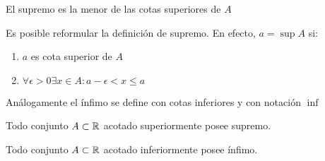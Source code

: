     \begin{obs}
        El supremo es la menor de las cotas superiores de $A$
    \end{obs}

    \begin{obs}
        Es posible reformular la definición de supremo. En efecto, $a=\sup A$ si:
        \begin{enumerate}
            \item $a$ es cota superior de $A$

            \item $\forall\epsilon>0\exists x\in A:a-\epsilon<x\leq a$

        \end{enumerate}
    \end{obs}

    \begin{defn}[Ínfimo]
        Análogamente el ínfimo se define con cotas inferiores y con notación $\inf$
    \end{defn}
    \begin{defn}
        Todo conjunto $A\subset\mathbb{R}$ acotado superiormente posee supremo.
    \end{defn}
    \begin{obs}
        Todo conjunto $A\subset\mathbb{R}$ acotado inferiormente posee ínfimo.
    \end{obs}

